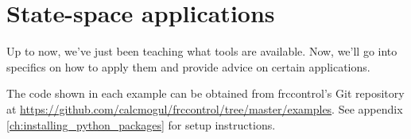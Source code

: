 
\chapter{State-space applications}

Up to now, we've just been teaching what tools are available. Now, we'll go into
specifics on how to apply them and provide advice on certain applications.

The code shown in each example can be obtained from frccontrol's Git repository
at \url{https://github.com/calcmogul/frccontrol/tree/master/examples}. See
appendix \ref{ch:installing_python_packages} for setup instructions.

\renewcommand*{\chapterpath}{\partpath/ss-applications}








